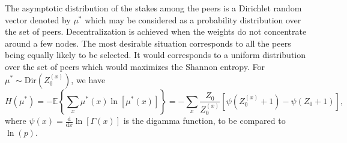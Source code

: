 The asymptotic distribution of the stakes among the peers is a Dirichlet random vector denoted by $\mu^{\ast}$ which may be considered as a probability distribution over the set of peers. Decentralization is achieved when the weights do not concentrate around a few nodes. The most desirable situation corresponds to all the peers being equally likely to be selected. It would corresponds to a uniform distribution over the set of peers which would maximizes the Shannon entropy. For $\mu^{\ast}\sim \text{Dir}(Z^{(x)}_0)$, we have 
$$
H(\mu^\ast) = -\mathbb{E}\left\{\sum_x \mu^\ast(x)\ln[\mu^\ast(x)]\right\} = -\sum_x\frac{Z_0}{Z_0^{(x)}}\left[\psi(Z_0^{(x)}+1)-\psi(Z_0+1)\right],
$$
where $\psi(x) = \frac{\text{d}}{\text{d}x}\ln[\Gamma(x)]$ is the digamma function, to be compared to $\ln(p)$.


